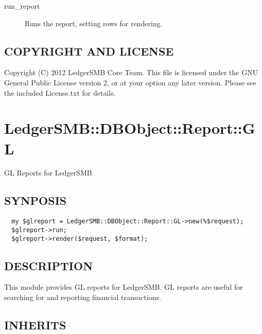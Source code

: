 \begin{description}
\begin{description}
\begin{description}
\begin{description}
\begin{description}
\begin{description}
\begin{description}
\begin{description}
\begin{description}
\begin{description}
\begin{description}
\item[{run\_report}] \mbox{}

Runs the report, setting rows for rendering.

\end{description}
\subsection*{COPYRIGHT AND LICENSE\label{LedgerSMB::DBObject::Report::Budget::Variance_COPYRIGHT_AND_LICENSE}}


Copyright (C) 2012 LedgerSMB Core Team.  This file is licensed under the GNU 
General Public License version 2, or at your option any later version.  Please
see the included License.txt for details.

\section{LedgerSMB::DBObject::Report::GL\label{LedgerSMB::DBObject::Report::GL}}


GL Reports for LedgerSMB

\subsection*{SYNPOSIS\label{LedgerSMB::DBObject::Report::GL_SYNPOSIS}}
\begin{verbatim}
  my $glreport = LedgerSMB::DBObject::Report::GL->new(%$request);
  $glreport->run;
  $glreport->render($request, $format);
\end{verbatim}
\subsection*{DESCRIPTION\label{LedgerSMB::DBObject::Report::GL_DESCRIPTION}}


This module provides GL reports for LedgerSMB.  GL reports are useful for 
searching for and reporting financial transactions.

\subsection*{INHERITS\label{LedgerSMB::DBObject::Report::GL_INHERITS}}
\begin{description}


\end{description}
\end{description}
\end{description}
\end{description}
\end{description}
\end{description}
\end{description}
\end{description}
\end{description}
\end{description}
\end{description}
